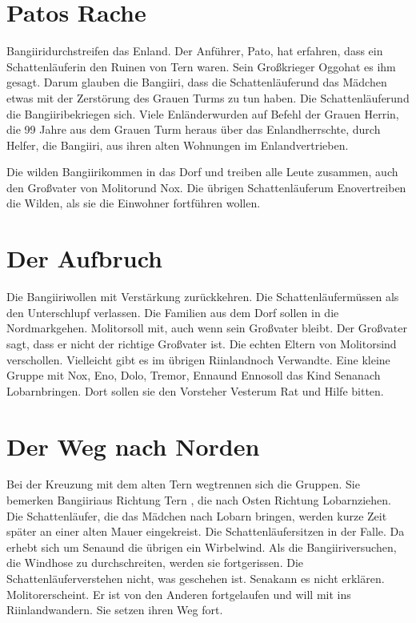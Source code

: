 \documentclass[12pt,a4paper,onecolumn,twoside,ngerman]{book}
\newcommand{\Tern}{Tern }
\newcommand{\Molitor}{Molitor}
\newcommand{\Ternweg}{{\Tern}weg}
\newcommand{\Sena}{Sena}
\newcommand{\Bangiri}{Bangiiri}
\newcommand{\Pato}{Pato}
\newcommand{\Oggo}{Oggo}
\newcommand{\Enland}{Enland}
\newcommand{\Enlaender}{Enländer}
\newcommand{\Schattenlaufer}{Schattenläufer}
\newcommand{\Eno}{Eno}
\newcommand{\Dolo}{Dolo}
\newcommand{\Nox}{Nox}
\newcommand{\Enna}{Enna}
\newcommand{\Enno}{Enno}
\newcommand{\Tremor}{Tremor}
\newcommand{\Lobarn}{Lobarn}
\newcommand{\Vester}{Vester}
\newcommand{\Nordmark}{Nordmark}
\newcommand{\Rhinland}{Riinland}
\begin{document}
\section{\Pato{s} Rache}
\Bangiri  durchstreifen das \Enland . Der Anführer, \Pato , hat erfahren, dass ein \Schattenlaufer in den Ruinen von \Tern waren. Sein Großkrieger \Oggo  hat es ihm gesagt. Darum glauben die \Bangiri , dass die \Schattenlaufer  und das Mädchen etwas mit der Zerstörung des Grauen Turms zu tun haben. Die \Schattenlaufer  und die \Bangiri  bekriegen sich. Viele \Enlaender  wurden auf Befehl der Grauen Herrin, die 99 Jahre aus dem Grauen Turm heraus über das \Enland  herrschte, durch Helfer, die \Bangiri , aus ihren alten Wohnungen im \Enland vertrieben.
 
Die wilden \Bangiri  kommen in das Dorf und treiben alle Leute zusammen, auch den Großvater von \Molitor und \Nox . Die übrigen \Schattenlaufer  um \Eno  vertreiben die Wilden, als sie die Einwohner fortführen wollen.

\section{Der Aufbruch}
Die \Bangiri  wollen mit Verstärkung zurückkehren. Die \Schattenlaufer  müssen als den Unterschlupf verlassen. Die Familien aus dem Dorf sollen in die \Nordmark  gehen. \Molitor  soll mit, auch wenn sein Großvater bleibt. Der Großvater sagt, dass er nicht der richtige Großvater ist. Die echten Eltern von \Molitor sind verschollen. Vielleicht gibt es im übrigen \Rhinland  noch Verwandte.
Eine kleine Gruppe mit \Nox , \Eno , \Dolo , \Tremor , \Enna  und \Enno  soll das Kind \Sena  nach \Lobarn  bringen. Dort sollen sie den Vorsteher \Vester  um Rat und Hilfe bitten.

\section{Der Weg nach Norden}
Bei der Kreuzung mit dem alten \Ternweg  trennen sich die Gruppen. Sie bemerken \Bangiri  aus Richtung \Tern , die nach Osten Richtung \Lobarn  ziehen. Die \Schattenlaufer , die das Mädchen nach \Lobarn  
 bringen, werden kurze Zeit später an einer alten Mauer eingekreist. Die \Schattenlaufer  sitzen in der Falle. Da erhebt sich um \Sena  und die übrigen ein Wirbelwind. Als die \Bangiri  versuchen, die Windhose zu durchschreiten, werden sie fortgerissen. Die \Schattenlaufer  verstehen nicht, was geschehen ist. \Sena  kann es nicht erklären. 
\Molitor  erscheint. Er ist von den Anderen fortgelaufen und will mit ins \Rhinland  wandern. Sie setzen ihren Weg fort.
\end{document}
